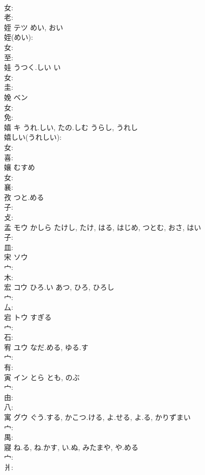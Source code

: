\documentclass[8pt]{extreport}
\begin{document}
\begin{CJK}{UTF8}{min}
\\	女: 
\\	老: 
\\	姪	テツ	めい, おい		
\\	姪(めい): 
\\	女: 
\\	至: 
\\	娃		うつく.しい	い		
\\	女: 
\\	圭: 
\\	娩	ベン			
\\	女: 
\\	免: 
\\	嬉	キ	うれ.しい, たの.しむ	うらし, うれし	
\\	嬉しい(うれしい): 
\\	女: 
\\	喜: 
\\	孃		むすめ				
\\	女: 
\\	襄: 
\\	孜		つと.める			
\\	子: 
\\	攴: 
\\	孟	モウ	かしら	たけし, たけ, はる, はじめ, つとむ, おさ, はい	
\\	子: 
\\	皿: 
\\	宋	ソウ			
\\	宀: 
\\	木: 
\\	宏	コウ	ひろ.い	あつ, ひろ, ひろし	
\\	宀: 
\\	厶: 
\\	宕	トウ	すぎる		
\\	宀: 
\\	石: 
\\	宥	ユウ	なだ.める, ゆる.す		
\\	宀: 
\\	有: 
\\	寅	イン	とら	とも, のぶ	
\\	宀: 
\\	由: 
\\	八: 
\\	寓	グウ	ぐう.する, かこつ.ける, よ.せる, よ.る, かりずまい		
\\	宀: 
\\	禺: 
\\	寢		ね.る, ね.かす, い.ぬ, みたまや, や.める				
\\	宀: 
\\	爿: 

\end{CJK}
\end{document}
